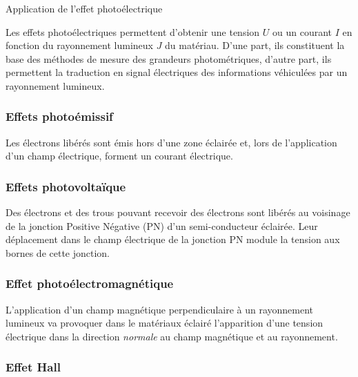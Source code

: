 \begin{exemple}{Application de l'effet photoélectrique}{}
\begin{figure}[H]
\end{figure}
Les effets photoélectriques permettent d'obtenir une tension $U$ ou un courant $I$ en fonction du rayonnement lumineux $J$ du matériau. D'une part, ils constituent la base des méthodes de mesure des grandeurs photométriques, d'autre part, ils permettent la traduction en signal électriques des informations véhiculées par un rayonnement lumineux.
\end{exemple}



\subsubsection{Effets photoémissif}

Les électrons libérés sont émis hors d'une zone éclairée et, lors de l'application d'un champ électrique, forment un courant électrique.

\subsubsection{Effets photovoltaïque}

Des électrons et des trous pouvant recevoir des électrons sont libérés au voisinage de la jonction Positive Négative (PN) d'un semi-conducteur éclairée. Leur déplacement dans le champ électrique de la jonction PN module la tension aux bornes de cette jonction.

\subsubsection{Effet photoélectromagnétique}

L'application d'un champ magnétique perpendiculaire à un rayonnement lumineux va provoquer dans le matériaux éclairé l'apparition d'une tension électrique dans la direction \emph{normale} au champ magnétique et au rayonnement.

\subsubsection{Effet Hall}

